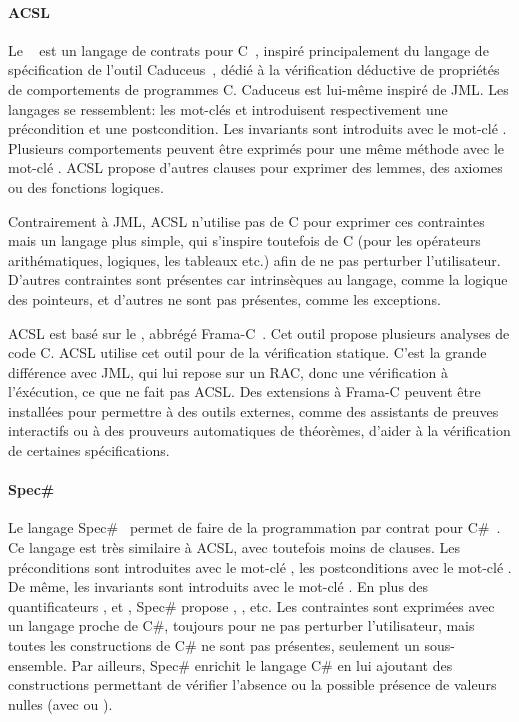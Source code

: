 \paragraph{ACSL} Le ~ est
un langage de contrats pour C~, inspiré principalement du langage de
spécification de l'outil Caduceus~, dédié à la vérification
déductive de propriétés de comportements de programmes C. Caduceus est lui-même
inspiré de JML. Les langages se ressemblent: les mot-clés  et
 introduisent respectivement une précondition et une
postcondition. Les invariants sont introduits avec le mot-clé .
Plusieurs comportements peuvent être exprimés pour une même méthode avec le
mot-clé . ACSL propose d'autres clauses pour exprimer des
lemmes, des axiomes ou des fonctions logiques.

Contrairement à JML, ACSL n'utilise pas de C pour exprimer ces contraintes mais
un langage plus simple, qui s'inspire toutefois de C (pour les opérateurs
arithématiques, logiques, les tableaux etc.) afin de ne pas perturber
l'utilisateur. D'autres contraintes sont présentes car intrinsèques au langage,
comme la logique des pointeurs, et d'autres ne sont pas présentes, comme les
exceptions.

ACSL est basé sur le , abbrégé
Frama-C~. Cet outil propose plusieurs analyses de code C. ACSL
utilise cet outil pour de la vérification statique. C'est la grande différence
avec JML, qui lui repose sur un RAC, donc une vérification à l'éxécution, ce que
ne fait pas ACSL. Des extensions à Frama-C peuvent être installées pour
permettre à des outils externes, comme des assistants de preuves interactifs ou
à des prouveurs automatiques de théorèmes, d'aider à la vérification de
certaines spécifications.

\paragraph{Spec\#} Le langage Spec\#~ permet de faire de la
programmation par contrat pour C\#~. Ce langage est très similaire
à ACSL, avec toutefois moins de clauses. Les préconditions sont introduites avec
le mot-clé , les postconditions avec le mot-clé .
De même, les invariants sont introduits avec le mot-clé . En
plus des quantificateurs ,  et ,
Spec\# propose , ,  etc. Les contraintes sont
exprimées avec un langage proche de C\#, toujours pour ne pas perturber
l'utilisateur, mais toutes les constructions de C\# ne sont pas présentes,
seulement un sous-ensemble.  Par ailleurs, Spec\# enrichit le langage C\# en lui
ajoutant des constructions permettant de vérifier l'absence ou la possible
présence de valeurs nulles (avec \code{!} ou ).

